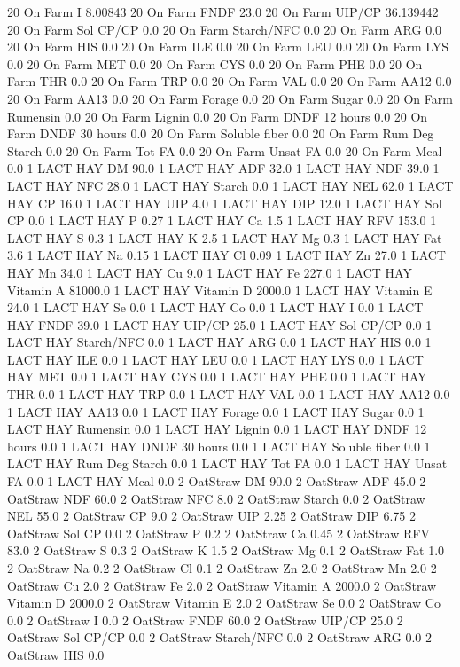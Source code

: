 \documentclass[letterpaper,10pt,english]{sphinxmanual}
\begin{document}
\begin{sphinxVerbatim}[commandchars=\\\{\},numbers=left,firstnumber=1,stepnumber=1]
20 On Farm I 8.00843
20 On Farm FNDF 23.0
20 On Farm UIP/CP 36.139442
20 On Farm Sol CP/CP 0.0
20 On Farm Starch/NFC 0.0
20 On Farm ARG 0.0
20 On Farm HIS 0.0
20 On Farm ILE 0.0
20 On Farm LEU 0.0
20 On Farm LYS 0.0
20 On Farm MET 0.0
20 On Farm CYS 0.0
20 On Farm PHE 0.0
20 On Farm THR 0.0
20 On Farm TRP 0.0
20 On Farm VAL 0.0
20 On Farm AA\PYGZsh{}12 0.0
20 On Farm AA\PYGZsh{}13 0.0
20 On Farm \PYGZpc{} Forage 0.0
20 On Farm Sugar \PYGZpc{} 0.0
20 On Farm Rumensin 0.0
20 On Farm Lignin 0.0
20 On Farm DNDF 12 hours 0.0
20 On Farm DNDF 30 hours 0.0
20 On Farm Soluble fiber 0.0
20 On Farm Rum Deg Starch 0.0
20 On Farm Tot FA 0.0
20 On Farm Unsat FA 0.0
20 On Farm Mcal 0.0
1 LACT HAY DM 90.0
1 LACT HAY ADF 32.0
1 LACT HAY NDF 39.0
1 LACT HAY NFC 28.0
1 LACT HAY Starch 0.0
1 LACT HAY NEL 62.0
1 LACT HAY CP 16.0
1 LACT HAY UIP 4.0
1 LACT HAY DIP 12.0
1 LACT HAY Sol CP 0.0
1 LACT HAY P 0.27
1 LACT HAY Ca 1.5
1 LACT HAY RFV 153.0
1 LACT HAY S 0.3
1 LACT HAY K 2.5
1 LACT HAY Mg 0.3
1 LACT HAY Fat 3.6
1 LACT HAY Na 0.15
1 LACT HAY Cl 0.09
1 LACT HAY Zn 27.0
1 LACT HAY Mn 34.0
1 LACT HAY Cu 9.0
1 LACT HAY Fe 227.0
1 LACT HAY Vitamin A 81000.0
1 LACT HAY Vitamin D 2000.0
1 LACT HAY Vitamin E 24.0
1 LACT HAY Se 0.0
1 LACT HAY Co 0.0
1 LACT HAY I 0.0
1 LACT HAY FNDF 39.0
1 LACT HAY UIP/CP 25.0
1 LACT HAY Sol CP/CP 0.0
1 LACT HAY Starch/NFC 0.0
1 LACT HAY ARG 0.0
1 LACT HAY HIS 0.0
1 LACT HAY ILE 0.0
1 LACT HAY LEU 0.0
1 LACT HAY LYS 0.0
1 LACT HAY MET 0.0
1 LACT HAY CYS 0.0
1 LACT HAY PHE 0.0
1 LACT HAY THR 0.0
1 LACT HAY TRP 0.0
1 LACT HAY VAL 0.0
1 LACT HAY AA\PYGZsh{}12 0.0
1 LACT HAY AA\PYGZsh{}13 0.0
1 LACT HAY \PYGZpc{} Forage 0.0
1 LACT HAY Sugar \PYGZpc{} 0.0
1 LACT HAY Rumensin 0.0
1 LACT HAY Lignin 0.0
1 LACT HAY DNDF 12 hours 0.0
1 LACT HAY DNDF 30 hours 0.0
1 LACT HAY Soluble fiber 0.0
1 LACT HAY Rum Deg Starch 0.0
1 LACT HAY Tot FA 0.0
1 LACT HAY Unsat FA 0.0
1 LACT HAY Mcal 0.0
2 OatStraw DM 90.0
2 OatStraw ADF 45.0
2 OatStraw NDF 60.0
2 OatStraw NFC 8.0
2 OatStraw Starch 0.0
2 OatStraw NEL 55.0
2 OatStraw CP 9.0
2 OatStraw UIP 2.25
2 OatStraw DIP 6.75
2 OatStraw Sol CP 0.0
2 OatStraw P 0.2
2 OatStraw Ca 0.45
2 OatStraw RFV 83.0
2 OatStraw S 0.3
2 OatStraw K 1.5
2 OatStraw Mg 0.1
2 OatStraw Fat 1.0
2 OatStraw Na 0.2
2 OatStraw Cl 0.1
2 OatStraw Zn 2.0
2 OatStraw Mn 2.0
2 OatStraw Cu 2.0
2 OatStraw Fe 2.0
2 OatStraw Vitamin A 2000.0
2 OatStraw Vitamin D 2000.0
2 OatStraw Vitamin E 2.0
2 OatStraw Se 0.0
2 OatStraw Co 0.0
2 OatStraw I 0.0
2 OatStraw FNDF 60.0
2 OatStraw UIP/CP 25.0
2 OatStraw Sol CP/CP 0.0
2 OatStraw Starch/NFC 0.0
2 OatStraw ARG 0.0
2 OatStraw HIS 0.0

\end{sphinxVerbatim}
\end{document}
